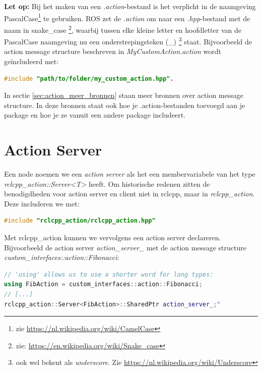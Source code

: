 \noindent \textbf{Let op:} Bij het maken van een \textit{.action}-bestand is het verplicht in de naamgeving PascalCase\footnote{zie \url{https://nl.wikipedia.org/wiki/CamelCase}} te gebruiken. ROS zet de \textit{.action} om naar een \textit{.hpp}-bestand met de naam in snake\_case \footnote{zie: \url{https://en.wikipedia.org/wiki/Snake_case}}, waarbij tussen elke kleine letter en hoofdletter van de PascalCase naamgeving nu een onderstrepingsteken (\_) \footnote{ook wel bekent als \textit{underscore}. Zie \url{https://nl.wikipedia.org/wiki/Underscore}} staat. Bijvoorbeeld de action message structure beschreven in \textit{MyCustomAction.action} wordt geïncludeerd met: 
\begin{lstlisting}[language=C++, caption={}, firstnumber=0, label={}]
#include "path/to/folder/my_custom_action.hpp".
\end{lstlisting}

\noindent In sectie \ref{sec:action_meer_bronnen} staan meer bronnen over action message structure. In deze bronnen staat ook hoe je .action-bestanden toevoegd aan je package en hoe je ze vanuit een andere package includeert. 

\section{Action Server}
Een node noemen we een \textit{action server} als het een membervariabele van het type \textit{rclcpp\_action::Server<T>} heeft. Om historische redenen zitten de benodigdheden voor action server en client niet in rclcpp, maar in \textit{rclcpp\_action}. Deze includeren we met:

\begin{lstlisting}[language=C++, caption={}, firstnumber=0, label={}]
#include "rclcpp_action/rclcpp_action.hpp"
\end{lstlisting}

\noindent Met rclcpp\_action kunnen we vervolgens een action server declareren.
Bijvoorbeeld de action server \textit{action\_server\_} met de action message structure \textit{custom\_interfaces::action::Fibonacci}:

\begin{lstlisting}[language=C++, caption={}, firstnumber=0, label={}]
// 'using' allows us to use a shorter word for long types:
using FibAction = custom_interfaces::action::Fibonacci;
// [...]
rclcpp_action::Server<FibAction>::SharedPtr action_server_;"
\end{lstlisting}

